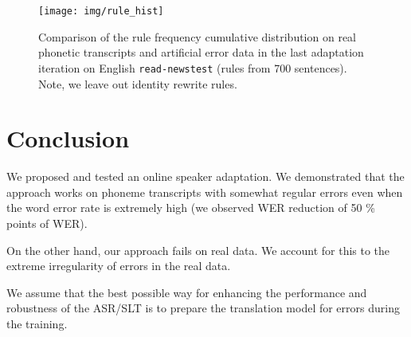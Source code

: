 \begin{figure}[h]
    \texttt{[image: img/rule\_hist]}
    \caption{Comparison of the rule frequency cumulative distribution on real phonetic transcripts and artificial error data in the last adaptation iteration on English \texttt{read-newstest} (rules from 700 sentences). Note, we leave out identity rewrite rules.}
    \label{fig:rule_hist} 
\end{figure}

\section{Conclusion}
\label{oeasr:conclusion}
We proposed and tested an online speaker adaptation. We demonstrated that the approach works on phoneme transcripts with somewhat regular errors even when the word error rate is extremely high (we observed WER reduction of 50 \% points of WER). 

On the other hand, our approach fails on real data. We account for this to the extreme irregularity of errors in the real data. 

We assume that the best possible way for enhancing the performance and robustness of the ASR/SLT is to prepare the translation model for errors during the training. 


